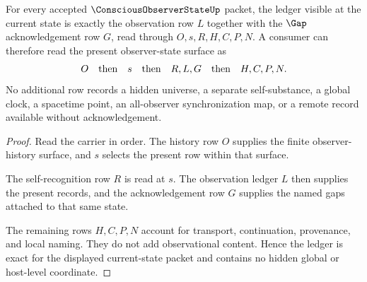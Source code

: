 \begin{theorem}
\label{thm:conscious-observer-state-ledger-exactness}
For every accepted $\ConsciousObserverStateUp$ packet, the ledger visible at the current state is exactly the observation row $L$ together with the $\Gap$ acknowledgement row $G$, read through $O,s,R,H,C,P,N$. A consumer can therefore read the present observer-state surface as
$$
O
\quad\hbox{then}\quad
s
\quad\hbox{then}\quad
R,L,G
\quad\hbox{then}\quad
H,C,P,N.
$$
No additional row records a hidden universe, a separate self-substance, a global clock, a spacetime point, an all-observer synchronization map, or a remote record available without acknowledgement.
\end{theorem}
\begin{proof}
Read the carrier in order. The history row $O$ supplies the finite observer-history surface, and $s$ selects the present row within that surface.

The self-recognition row $R$ is read at $s$. The observation ledger $L$ then supplies the present records, and the acknowledgement row $G$ supplies the named gaps attached to that same state.

The remaining rows $H,C,P,N$ account for transport, continuation, provenance, and local naming. They do not add observational content. Hence the ledger is exact for the displayed current-state packet and contains no hidden global or host-level coordinate.
\end{proof}

